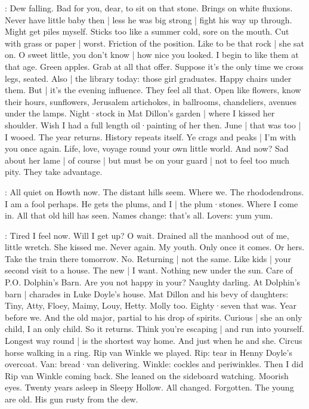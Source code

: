 \Bloom:
Dew falling.
Bad for you,
dear,
to sit on that stone.
Brings on white fluxions.
Never have little baby then |
less he was big strong |
fight his way up through.
Might get piles myself.
Sticks too like a summer cold,
sore on the mouth.
Cut with grass or paper |
worst.
Friction of the position.
Like to be that rock |
she sat on.
O sweet little,
you don't know |
how nice you looked.
I begin to like them at that age.
Green apples.
Grab at all that offer.
Suppose it's the only time we cross legs,
seated.
Also |
the library today:
those girl graduates.
Happy chairs under them.
But |
it's the evening influence.
They feel all that.
Open like flowers,
know their hours,
sunflowers,
Jerusalem artichokes,
in ballrooms,
chandeliers,
avenues under the lamps.%
Night·stock in Mat Dillon's garden |
where I kissed her shoulder.
Wish I had a full length oil·painting of her then.
June |
that was too |
I wooed.
The year returns.
History repeats itself.
Ye crags and peaks |
I'm with you once again.
Life,
love,
voyage round your own little world.
And now?
Sad about her lame |
of course |
but must be on your guard |
not to feel too much pity.
They take advantage.

\Bloom:
All quiet on Howth now.
The distant hills seem.
Where we.
The rhododendrons.
I am a fool perhaps.
He gets the plums,
and I |
the plum·stones.
Where I come in.
All that old hill has seen.
Names change:
that's all.%
Lovers:
yum yum.

\Bloom:
Tired I feel now.
Will I get up?
O wait.
Drained all the manhood out of me,
little wretch.
She kissed me.
Never again.
My youth.
Only once it comes.
Or hers.
Take the train there tomorrow.
No.
Returning |
not the same.
Like kids |
your second visit to a house.
The new |
I want.
Nothing new under the sun.
Care of P.O. Dolphin's Barn.
Are you not happy in your?
Naughty darling.
At Dolphin's barn |
charades in Luke Doyle's house.
Mat Dillon and his bevy of daughters:
Tiny,
Atty,
Floey,
Maimy,
Louy,
Hetty.
Molly too.
Eighty·seven that was.
Year before we.
And the old major,
partial to his drop of spirits.
Curious |
she an only child,
I an only child.
So it returns.
Think you're escaping |
and run into yourself.%
Longest way round |
is the shortest way home.
And just when he and she.
Circus horse
walking in a ring.
Rip van Winkle
we played.
Rip: tear in Henny Doyle's overcoat.
Van: bread·van delivering.
Winkle: cockles and periwinkles.
Then I did Rip van Winkle coming back.
She leaned on the sideboard watching.
Moorish eyes.
Twenty years asleep in Sleepy Hollow.
All changed.
Forgotten.
The young are old.
His gun rusty from the dew.

